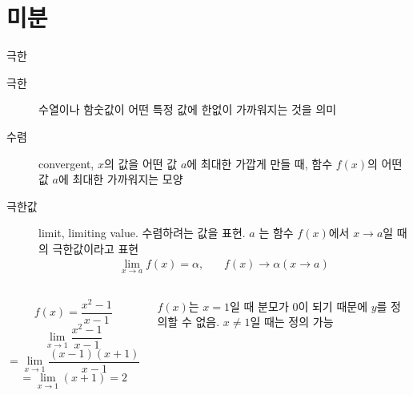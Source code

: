 \documentclass[10pt,t]{beamer}
\begin{document}
\section{미분}
\begin{frame}[fragile]{극한}
\begin{description}
    \item[극한] 수열이나 함숫값이 어떤 특정 값에 한없이 가까워지는 것을 의미
    \item[수렴] convergent, $x$의 값을 어떤 값 $a$에 최대한 가깝게 만들 때, 함수 $f(x)$의 어떤 값 $a$에 최대한 가까워지는 모양
    \item[극한값] limit, limiting value. 수렴하려는 값을 표현. $a$ 는 함수 $f(x)$에서 $x \rightarrow a$일 때의 극한값이라고 표현
    \begin{eqnarray*}
        \lim _{x \rightarrow a} f(x) = \alpha,~~~~~~~~
        f(x) \rightarrow \alpha (x \rightarrow a)
    \end{eqnarray*}  
\end{description}

\begin{columns}
    \vspace{-11em}
    \[f(x) = \frac{x^2-1}{x-1}\]
    \[\lim _{x \rightarrow 1} \frac{x^2-1}{x-1}\]
    \[=\lim _{x \rightarrow 1} \frac{(x-1)(x+1)}{x-1}\]
    \[=\lim _{x \rightarrow 1} (x+1) =2\]
\vspace{-8em}

$f(x)$는 $x=1$일 때 분모가 $0$이 되기 때문에 $y$를 정의할 수 없음. $x\neq1$일 때는 정의 가능
\end{columns}
\end{frame}
\end{document}
